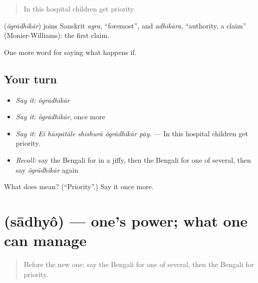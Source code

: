 \begin{quote}
In this hospital children get priority.
\end{quote}

\begin{cousinweb}
\textbf{} (\emph{ôgrādhikār}) joins Sanskrit \emph{agra}, \textquotedblleft{}foremost\textquotedblright{}, and \emph{adhikāra}, \textquotedblleft{}authority, a claim\textquotedblright{} (Monier-Williams): the first claim.
\end{cousinweb}

\begin{grammarlens}[title={What you've built}]
One more word for saying what happens if.
\end{grammarlens}

\subsection*{Your turn}
\begin{itemize}
\raggedright
  \item \emph{Say it:} \emph{ôgrādhikār}
  \item \emph{Say it:} \emph{ôgrādhikār}, once more
  \item \emph{Say it:} \emph{Ei hāspātāle shishurā ôgrādhikār pāy.} — In this hospital children get priority.
  \item \emph{Recall:} say the Bengali for in a jiffy, then the Bengali for one of several, then say \emph{ôgrādhikār} again
\end{itemize}

\begin{tcolorbox}[breakable,colback=teal!4,colframe=teal!35!black,title={Before you move on}]
What does  mean? (\textquotedblleft{}Priority\textquotedblright{}.) Say it once more.
\end{tcolorbox}
\section[\texorpdfstring{\bn{সাধ্য} (sādhyô)}{সাধ্য (sādhyô)}]{ (sādhyô) — one's power; what one can manage}

\label{lesson:BN-C545-sadhyo}



\begin{quote}
Before the new one: say the Bengali for one of several, then the Bengali for priority.
\end{quote}

